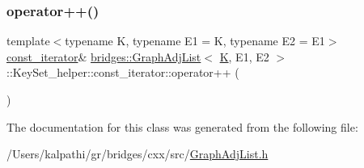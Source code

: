 \mbox{\label{classbridges_1_1_graph_adj_list_1_1_key_set__helper_1_1const__iterator_a9fa08ff89640b3347c15a3858664cfdc}} 
\subsubsection{\texorpdfstring{operator++()}{operator++()}}
{\footnotesize\ttfamily template$<$typename K, typename E1 = K, typename E2 = E1$>$ \\
\mbox{\hyperlink{classbridges_1_1_graph_adj_list_1_1_key_set__helper_1_1const__iterator}{const\+\_\+iterator}}\& \mbox{\hyperlink{classbridges_1_1_graph_adj_list}{bridges\+::\+Graph\+Adj\+List}}$<$ \mbox{\hyperlink{namespacebridges_acfb0a4f7877d8f63de3e6862004c50edaa5f3c6a11b03839d46af9fb43c97c188}{K}}, E1, E2 $>$\+::Key\+Set\+\_\+helper\+::const\+\_\+iterator\+::operator++ (\begin{DoxyParamCaption}{ }\end{DoxyParamCaption})\hspace{0.3cm}{\ttfamily [inline]}}



The documentation for this class was generated from the following file\+:\begin{DoxyCompactItemize}
\item 
/\+Users/kalpathi/gr/bridges/cxx/src/\mbox{\hyperlink{_graph_adj_list_8h}{Graph\+Adj\+List.\+h}}\end{DoxyCompactItemize}
